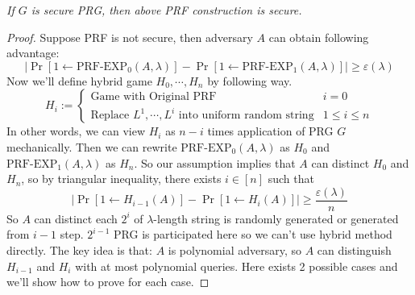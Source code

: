 \documentclass[12pt, a4paper, openany, twoside]{book}
\theoremstyle{definition}
\theoremstyle{remark}
\theoremstyle{plain}
\numberwithin{equation}{section}
\begin{document}
\begin{tcolorbox}[colback=yellow!10!white,colframe=blue!75!black,title=Length Doubling PRF Construction is Secure]

\textit{If $G$ is secure PRG, then above PRF construction is secure.}

\end{tcolorbox}

\begin{proof}
    
Suppose PRF is not secure, then adversary $A$ can obtain following advantage: 
\[\bigg|\Pr\left[1 \gets \text{PRF-EXP}_0(A, \lambda)\right] - \Pr\left[1 \gets \text{PRF-EXP}_1(A, \lambda)\right]\bigg| \geq \varepsilon(\lambda)\]
Now we'll define hybrid game $H_0, \cdots, H_n$ by following way. 
\[H_i := \begin{cases} 
    \text{Game with Original PRF} & i = 0 \\
    \text{Replace $L^1, \cdots, L^i$ into uniform random string} & 1 \leq i \leq n
\end{cases}\]
In other words, we can view $H_i$ as $n - i$ times application of PRG $G$ mechanically.
Then we can rewrite $\text{PRF-EXP}_0(A, \lambda)$ as $H_0$ and $\text{PRF-EXP}_1(A, \lambda)$ as $H_n$. So our assumption implies that $A$ can distinct $H_0$ and $H_n$, so by triangular inequality, 
there exists $i \in [n]$ such that 
\[\bigg|\Pr\left[1 \gets H_{i-1}(A)\right] - \Pr\left[1 \gets H_{i}(A)\right]\bigg| \geq \frac{\varepsilon(\lambda)}{n}\]
So $A$ can distinct each $2^i$ of $\lambda$-length string is randomly generated or generated from $i-1$ step. 
$2^{i-1}$ PRG is participated here so we can't use hybrid method directly. The key idea is that: $A$ is polynomial adversary, so $A$ can distinguish $H_{i-1}$ and $H_i$ with at most polynomial queries. 
Here exists 2 possible cases and we'll show how to prove for each case. 


\end{proof}
\end{document}
